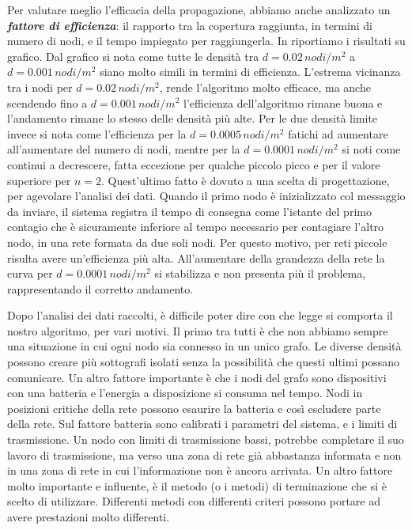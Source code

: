Per valutare meglio l'efficacia della propagazione, abbiamo anche analizzato un \textit{\textbf{fattore di efficienza}}: il rapporto tra la copertura raggiunta, in termini di numero di nodi, e il tempo impiegato per raggiungerla. In  riportiamo i risultati su grafico. Dal grafico si nota come tutte le densità tra $d=0.02\, nodi/m^2$ a $d=0.001\, nodi/m^2$ siano molto simili in termini di efficienza. L'estrema vicinanza tra i nodi per $d=0.02\, nodi/m^2$, rende l'algoritmo molto efficace, ma anche scendendo fino a $d=0.001\, nodi/m^2$ l'efficienza dell'algoritmo rimane buona e l'andamento rimane lo stesso delle densità più alte. Per le due densità limite invece si nota come l'efficienza per la $d=0.0005\, nodi/m^2$ fatichi ad aumentare all'aumentare del numero di nodi, mentre per la $d=0.0001\, nodi/m^2$ si noti come continui a decrescere, fatta eccezione per qualche piccolo picco e per il valore superiore per $n=2$. Quest'ultimo fatto è dovuto a una scelta di progettazione, per agevolare l'analisi dei dati. Quando il primo nodo è inizializzato col messaggio da inviare, il sistema registra il tempo di consegna come l'istante del primo contagio che è sicuramente inferiore al tempo necessario per contagiare l'altro nodo, in una rete formata da due soli nodi. Per questo motivo, per reti piccole risulta avere un'efficienza più alta. All'aumentare della grandezza della rete la curva per $d=0.0001\, nodi/m^2$ si stabilizza e non presenta più il problema, rappresentando il corretto andamento.

Dopo l'analisi dei dati raccolti, è difficile poter dire con che legge si comporta il nostro algoritmo, per vari motivi. Il primo tra tutti è che non abbiamo sempre una situazione in cui ogni nodo sia connesso in un unico grafo. Le diverse densità possono creare più sottografi isolati senza la possibilità che questi ultimi possano comunicare. Un altro fattore importante è che i nodi del grafo sono dispositivi con una batteria e l'energia a disposizione si consuma nel tempo. Nodi in posizioni critiche della rete possono esaurire la batteria e così escludere parte della rete. Sul fattore batteria sono calibrati i parametri del sistema, e i limiti di trasmissione. Un nodo con limiti di trasmissione bassi, potrebbe completare il suo lavoro di trasmissione, ma verso una zona di rete già abbastanza informata e non in una zona di rete in cui l'informazione non è ancora arrivata. Un altro fattore molto importante e influente, è il metodo (o i metodi) di terminazione che si è scelto di utilizzare. Differenti metodi con differenti criteri possono portare ad avere prestazioni molto differenti.

